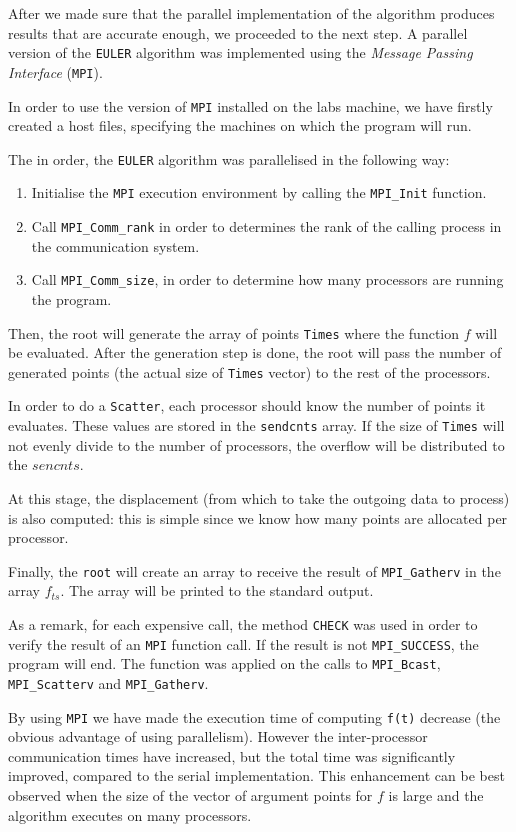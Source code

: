 After we made sure that the parallel implementation of the algorithm produces results that
are accurate enough, we proceeded to the next step.
A parallel version of the \texttt{EULER} algorithm was implemented using the \emph{Message Passing Interface} (\texttt{MPI}).

In order to use the version of \texttt{MPI} installed on the labs machine, we have firstly created a host files,
specifying  the machines on which the program will run.

The in order, the \texttt{EULER} algorithm was parallelised in the following way:
\begin{enumerate}
 \item{Initialise the \texttt{MPI} execution environment by calling the \texttt{MPI\_Init} function.}
 \item{Call \texttt{MPI\_Comm\_rank} in order to determines the rank of the calling process in the communication system.}
 \item{Call \texttt{MPI\_Comm\_size}, in order to determine how many processors are running the program.}
\end{enumerate}

Then, the root will generate the array of points \texttt{Times} where the function $f$ will be evaluated.
After the generation step is done, the root will pass the number of generated points (the actual size of 
\texttt{Times} vector) to the rest of the processors.
\newline

In order to do a \texttt{Scatter}, each processor should know the number of points it evaluates. These
values are stored in the \texttt{sendcnts} array. If the size of \texttt{Times} will not evenly divide to the
number of processors, the overflow will be distributed to the $sencnts$.

At this stage, the displacement (from which to take the outgoing data to process) is also computed: 
this is simple since we know how many points are allocated per processor.


Finally, the \texttt{root} will create an array to receive the result of \texttt{MPI\_Gatherv} in the array $f_{ts}$.
The array will be printed to the standard output.

As a remark, for each expensive call, the method \texttt{CHECK} was used in order to verify the result of an \texttt{MPI} function call. 
If the result is not \texttt{MPI\_SUCCESS}, the program will end. The function was applied on the calls to \texttt{MPI\_Bcast}, \texttt{MPI\_Scatterv}  and \texttt{MPI\_Gatherv}.

By using \texttt{MPI} we have made the execution time of computing \texttt{f(t)} decrease (the obvious advantage of using parallelism). 
However the inter-processor communication times have increased, but the total time was significantly improved, compared
to the serial implementation. This enhancement can be best observed when the size of the vector of argument points for $f$ is large and the algorithm executes on many processors.

